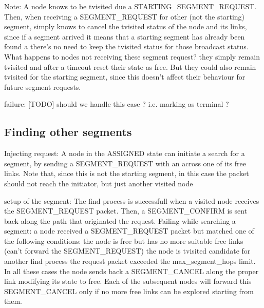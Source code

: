 \documentclass[conference]{IEEEtran}
\begin{document}
Note: A node knows to be tvisited due a  STARTING\_SEGMENT\_REQUEST.
Then, when receiving a SEGMENT\_REQUEST for other (not the starting)
segment, simply knows to cancel the tvisited status of the node and
its links, since if a segment arrived it means that a starting segment
has already been found a there’s no need to keep the tvisited status
for those broadcast status. What happens to nodes not receiving these
segment request? they simply remain tvisited and after a timeout reset
their state as free. But they could also remain tvisited for the
starting segment, since this doesn’t affect their behaviour for future
segment requests.  

failure: [TODO] should we handle this case ? i.e.
marking as terminal ?

\subsection{Finding other segments}

Injecting request: A node in the ASSIGNED state can initiate a search for a
segment, by sending a SEGMENT\_REQUEST with an across one of its free
links. Note that, since this is not the starting segment, in this case
the packet should not reach the initiator, but just another visited
node

setup of the segment: The find process is successfull when a visited
node receives the SEGMENT\_REQUEST packet. Then, a SEGMENT\_CONFIRM is
sent back along the path that originated the request.  Failing while
searching a segment: a node received a SEGMENT\_REQUEST packet but
matched one of the following conditions: the node is free but has no
more suitable free links (can’t forward the SEGMENT\_REQUEST) the node
is tvisited candidate for another find process the request packet
exceeded the max\_segment\_hops limit.  In all these cases the node
sends back a SEGMENT\_CANCEL along the proper link modifying its state
to free. Each of the subsequent nodes will forward this SEGMENT\_CANCEL
only if no more free links can be explored starting from them.
\end{document}
